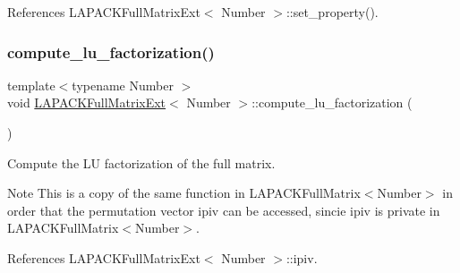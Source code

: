 References L\+A\+P\+A\+C\+K\+Full\+Matrix\+Ext$<$ Number $>$\+::set\+\_\+property().

\mbox{\label{classLAPACKFullMatrixExt_a110a711628c9d66adb2161779f2ecf63}} 
\subsubsection{\texorpdfstring{compute\+\_\+lu\+\_\+factorization()}{compute\_lu\_factorization()}}
{\footnotesize\ttfamily template$<$typename Number $>$ \\
void \hyperlink{classLAPACKFullMatrixExt}{L\+A\+P\+A\+C\+K\+Full\+Matrix\+Ext}$<$ Number $>$\+::compute\+\_\+lu\+\_\+factorization (\begin{DoxyParamCaption}{ }\end{DoxyParamCaption})}

Compute the LU factorization of the full matrix.


\begin{DoxyDescription}
\item[Note ]This is a copy of the same function in {\ttfamily L\+A\+P\+A\+C\+K\+Full\+Matrix$<$\+Number$>$} in order that the permutation vector {\ttfamily ipiv} can be accessed, sincie {\ttfamily ipiv} is private in {\ttfamily L\+A\+P\+A\+C\+K\+Full\+Matrix$<$\+Number$>$}. 
\end{DoxyDescription}

References L\+A\+P\+A\+C\+K\+Full\+Matrix\+Ext$<$ Number $>$\+::ipiv.

\mbox{\label{classLAPACKFullMatrixExt_a82a4dc9f9f5de6913e26f479eb3880f7}} 
